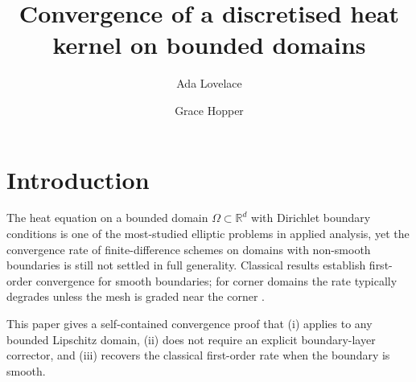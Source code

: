 \documentclass[journal=gmj]{CUP-JNL-DTM}
\theoremstyle{definition}
\begin{document}
\begin{Frontmatter}

\title[Convergence of a discretised heat kernel on bounded domains]{Convergence of a discretised heat kernel on bounded domains}

\author[1]{Ada Lovelace}
\author[2]{Grace Hopper}


\address[1]{, , }
\address[2]{, , . }




\end{Frontmatter}

\section{Introduction}

The heat equation on a bounded domain $\Omega \subset \mathbb{R}^d$ with
Dirichlet boundary conditions is one of the most-studied elliptic problems in
applied analysis, yet the convergence rate of finite-difference schemes on
domains with non-smooth boundaries is still not settled in full generality.
Classical results \citep{knuth:1984} establish first-order convergence for
smooth boundaries; for corner domains the rate typically degrades unless the
mesh is graded near the corner \citep{lesk:1977}.

This paper gives a self-contained convergence proof that (i) applies to any
bounded Lipschitz domain, (ii) does not require an explicit boundary-layer
corrector, and (iii) recovers the classical first-order rate when the
boundary is smooth.
\end{document}
